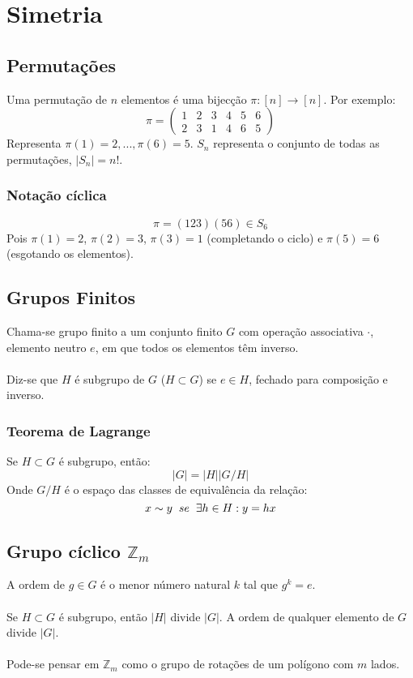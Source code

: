 \documentclass[10pt,a4paper]{report}
\begin{document}
\section{Simetria}
\subsection{Permutações}
Uma permutação de $n$ elementos é uma bijecção $\pi : [n] \rightarrow [n]$. Por exemplo:
$$
\pi = \begin{pmatrix}
1 & 2 & 3 & 4 & 5 & 6\\
2 & 3 & 1 & 4 & 6 & 5
\end{pmatrix}
$$
Representa $\pi(1) = 2, ..., \pi(6) = 5$. $S_n$ representa o conjunto de todas as permutações, $|S_n| = n!$.
\subsubsection{Notação cíclica}
$$
\pi = (123)(56) \in S_6
$$
Pois $\pi(1) = 2$, $\pi(2) = 3$, $\pi(3) = 1$ (completando o ciclo) e $\pi(5) = 6$ (esgotando os elementos).
\subsection{Grupos Finitos}
Chama-se grupo finito a um conjunto finito $G$ com operação associativa $\cdot$, elemento neutro $e$, em que todos os elementos têm inverso.\\
\\
Diz-se que $H$ é subgrupo de $G$ ($H \subset G$) se $e \in H$, fechado para composição e inverso.
\subsubsection{Teorema de Lagrange}
Se $H \subset G$ é subgrupo, então:
$$
|G| = |H| |G/H|
$$
Onde $G/H$ é o espaço das classes de equivalência da relação:
$$
x \sim y \hspace{0.2cm} se \hspace{0.2cm} \exists h \in H : y = hx
$$
\subsection{Grupo cíclico $\mathbb{Z}_m$}
A ordem de $g \in G$ é o menor número natural $k$ tal que $g^k = e$.\\
\\
Se $H \subset G$ é subgrupo, então $|H|$ divide $|G|$. A ordem de qualquer elemento de $G$ divide $|G|$.\\
\\
Pode-se pensar em $\mathbb{Z}_m$ como o grupo de rotações de um polígono com $m$ lados.
\end{document}
